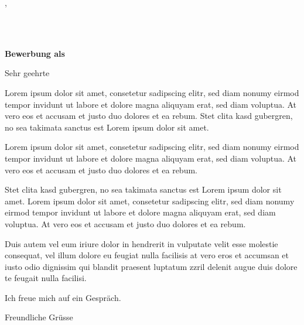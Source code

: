 
\setlength{\parskip}{6.5pt}

\noindent
\CVcity, 

\vspace{0.5cm}

\noindent
{\sffamily\bfseries\companyname}\\
\departmentname\\
\companyaddr

\vspace{0.5cm}

\noindent
{\color{headercolor}\sffamily\bfseries\large Bewerbung als \positionname}

\vspace{0.5cm}

\noindent
Sehr geehrte \recipientname

\vspace{0.3cm}

Lorem ipsum dolor sit amet, consetetur sadipscing elitr, sed diam nonumy eirmod tempor invidunt ut labore et dolore magna aliquyam erat, sed diam voluptua. At vero eos et accusam et justo duo dolores et ea rebum. Stet clita kasd gubergren, no sea takimata sanctus est Lorem ipsum dolor sit amet.

Lorem ipsum dolor sit amet, consetetur sadipscing elitr, sed diam nonumy eirmod tempor invidunt ut labore et dolore magna aliquyam erat, sed diam voluptua. At vero eos et accusam et justo duo dolores et ea rebum.

Stet clita kasd gubergren, no sea takimata sanctus est Lorem ipsum dolor sit amet. Lorem ipsum dolor sit amet, consetetur sadipscing elitr, sed diam nonumy eirmod tempor invidunt ut labore et dolore magna aliquyam erat, sed diam voluptua. At vero eos et accusam et justo duo dolores et ea rebum.

Duis autem vel eum iriure dolor in hendrerit in vulputate velit esse molestie consequat, vel illum dolore eu feugiat nulla facilisis at vero eros et accumsan et iusto odio dignissim qui blandit praesent luptatum zzril delenit augue duis dolore te feugait nulla facilisi.

Ich freue mich auf ein Gespräch.

\vspace{0.2cm}

\noindent
Freundliche Grüsse


\noindent
\CVname

